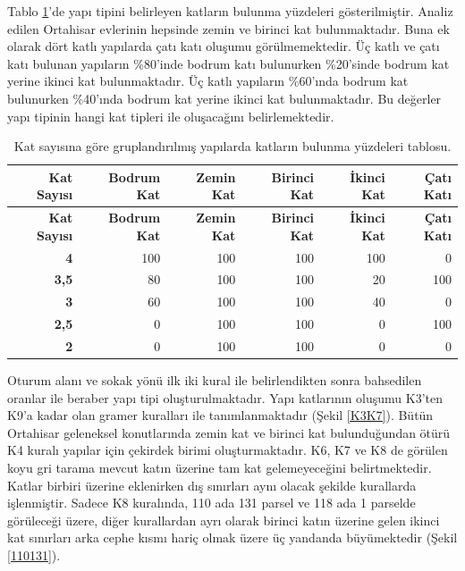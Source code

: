 \documentclass[12pt,turkish,a4paperpaper,]{report}
\begin{document}
Tablo \ref{katbulunmayuzde}'de yapı tipini belirleyen katların bulunma
yüzdeleri gösterilmiştir. Analiz edilen Ortahisar evlerinin hepsinde
zemin ve birinci kat bulunmaktadır. Buna ek olarak dört katlı yapılarda
çatı katı oluşumu görülmemektedir. Üç katlı ve çatı katı bulunan
yapıların \%80'inde bodrum katı bulunurken \%20'sinde bodrum kat yerine
ikinci kat bulunmaktadır. Üç katlı yapıların \%60'ında bodrum kat
bulunurken \%40'ında bodrum kat yerine ikinci kat bulunmaktadır. Bu
değerler yapı tipinin hangi kat tipleri ile oluşacağını belirlemektedir.

\begin{longtable}[]{@{}rrrrrr@{}}
\caption{Kat sayısına göre gruplandırılmış yapılarda katların bulunma
yüzdeleri tablosu. \label{katbulunmayuzde}}\tabularnewline
\toprule
\textbf{Kat Sayısı} & \textbf{Bodrum Kat} & \textbf{Zemin Kat} &
\textbf{Birinci Kat} & \textbf{İkinci Kat} & \textbf{Çatı
Katı}\tabularnewline
\midrule
\endfirsthead
\toprule
\textbf{Kat Sayısı} & \textbf{Bodrum Kat} & \textbf{Zemin Kat} &
\textbf{Birinci Kat} & \textbf{İkinci Kat} & \textbf{Çatı
Katı}\tabularnewline
\midrule
\endhead
\textbf{4} & 100 & 100 & 100 & 100 & 0\tabularnewline
\textbf{3,5} & 80 & 100 & 100 & 20 & 100\tabularnewline
\textbf{3} & 60 & 100 & 100 & 40 & 0\tabularnewline
\textbf{2,5} & 0 & 100 & 100 & 0 & 100\tabularnewline
\textbf{2} & 0 & 100 & 100 & 0 & 0\tabularnewline
\bottomrule
\end{longtable}

Oturum alanı ve sokak yönü ilk iki kural ile belirlendikten sonra
bahsedilen oranlar ile beraber yapı tipi oluşturulmaktadır. Yapı
katlarının oluşumu K3'ten K9'a kadar olan gramer kuralları ile
tanımlanmaktadır (Şekil \ref{K3K7}). Bütün Ortahisar geleneksel
konutlarında zemin kat ve birinci kat bulunduğundan ötürü K4 kuralı
yapılar için çekirdek birimi oluşturmaktadır. K6, K7 ve K8 de görülen
koyu gri tarama mevcut katın üzerine tam kat gelemeyeceğini
belirtmektedir. Katlar birbiri üzerine eklenirken dış sınırları aynı
olacak şekilde kurallarda işlenmiştir. Sadece K8 kuralında, 110 ada 131
parsel ve 118 ada 1 parselde görüleceği üzere, diğer kurallardan ayrı
olarak birinci katın üzerine gelen ikinci kat sınırları arka cephe kısmı
hariç olmak üzere üç yandanda büyümektedir (Şekil \ref{110131}).
\end{document}
